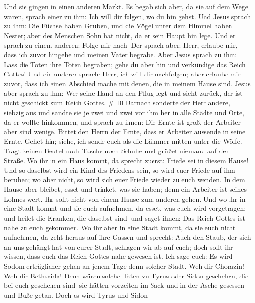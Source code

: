  Und sie gingen in einen anderen Markt. Es begab sich aber,
da sie auf dem Wege waren, sprach einer zu ihm: Ich will dir folgen, wo
du hin gehst.  Und Jesus sprach zu ihm: Die Füchse haben
Gruben, und die Vögel unter dem Himmel haben Nester; aber des Menschen
Sohn hat nicht, da er sein Haupt hin lege.  Und er sprach
zu einem anderen: Folge mir nach! Der sprach aber: Herr, erlaube mir,
dass ich zuvor hingehe und meinen Vater begrabe.  Aber
Jesus sprach zu ihm: Lass die Toten ihre Toten begraben; gehe du aber
hin und verkündige das Reich Gottes!  Und ein anderer
sprach: Herr, ich will dir nachfolgen; aber erlaube mir zuvor, dass ich
einen Abschied mache mit denen, die in meinem Hause sind. 
Jesus aber sprach zu ihm: Wer seine Hand an den Pflug legt und sieht
zurück, der ist nicht geschickt zum Reich Gottes. \# 10 
Darnach sonderte der Herr andere, siebzig aus und sandte sie je zwei und
zwei vor ihm her in alle Städte und Orte, da er wollte hinkommen,
 und sprach zu ihnen: Die Ernte ist groß, der Arbeiter aber
sind wenige. Bittet den Herrn der Ernte, dass er Arbeiter aussende in
seine Ernte.  Gehet hin; siehe, ich sende euch als die
Lämmer mitten unter die Wölfe.  Tragt keinen Beutel noch
Tasche noch Schuhe und grüßet niemand auf der Straße.  Wo
ihr in ein Haus kommt, da sprecht zuerst: Friede sei in diesem Hause!
 Und so daselbst wird ein Kind des Friedens sein, so wird
euer Friede auf ihm beruhen; wo aber nicht, so wird sich euer Friede
wieder zu euch wenden.  In dem Hause aber bleibet, esset und
trinket, was sie haben; denn ein Arbeiter ist seines Lohnes wert. Ihr
sollt nicht von einem Hause zum anderen gehen.  Und wo ihr
in eine Stadt kommt und sie euch aufnehmen, da esset, was euch wird
vorgetragen;  und heilet die Kranken, die daselbst sind, und
saget ihnen: Das Reich Gottes ist nahe zu euch gekommen. 
Wo ihr aber in eine Stadt kommt, da sie euch nicht aufnehmen, da geht
heraus auf ihre Gassen und sprecht:  Auch den Staub, der
sich an uns gehängt hat von eurer Stadt, schlagen wir ab auf euch; doch
sollt ihr wissen, dass euch das Reich Gottes nahe gewesen ist.
 Ich sage euch: Es wird Sodom erträglicher gehen an jenem
Tage denn solcher Stadt.  Weh dir Chorazin! Weh dir
Bethsaida! Denn wären solche Taten zu Tyrus oder Sidon geschehen, die
bei euch geschehen sind, sie hätten vorzeiten im Sack und in der Asche
gesessen und Buße getan.  Doch es wird Tyrus und Sidon
